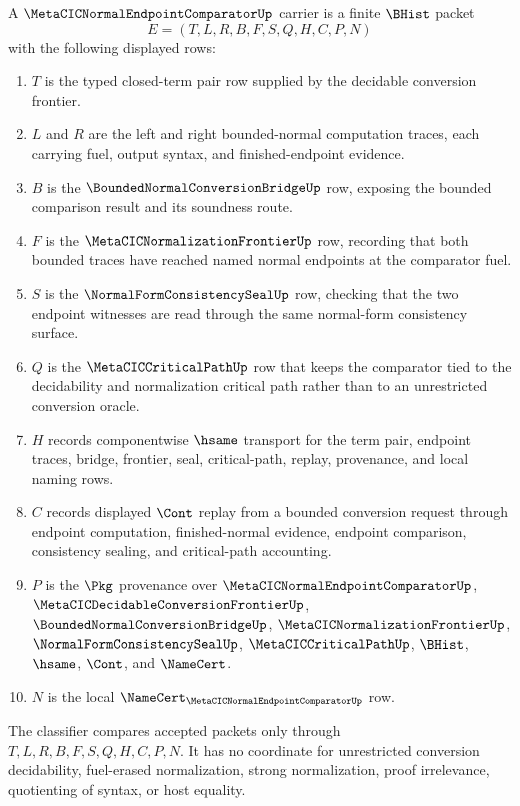 \begin{definition}
\label{def:metacic-normal-endpoint-comparator-carrier}
A $\MetaCICNormalEndpointComparatorUp$ carrier is a finite $\BHist$ packet
$$
E=(T,L,R,B,F,S,Q,H,C,P,N)
$$
with the following displayed rows:
\begin{enumerate}
\item $T$ is the typed closed-term pair row supplied by the decidable conversion frontier.
\item $L$ and $R$ are the left and right bounded-normal computation traces, each carrying fuel, output syntax, and finished-endpoint evidence.
\item $B$ is the $\BoundedNormalConversionBridgeUp$ row, exposing the bounded comparison result and its soundness route.
\item $F$ is the $\MetaCICNormalizationFrontierUp$ row, recording that both bounded traces have reached named normal endpoints at the comparator fuel.
\item $S$ is the $\NormalFormConsistencySealUp$ row, checking that the two endpoint witnesses are read through the same normal-form consistency surface.
\item $Q$ is the $\MetaCICCriticalPathUp$ row that keeps the comparator tied to the decidability and normalization critical path rather than to an unrestricted conversion oracle.
\item $H$ records componentwise $\hsame$ transport for the term pair, endpoint traces, bridge, frontier, seal, critical-path, replay, provenance, and local naming rows.
\item $C$ records displayed $\Cont$ replay from a bounded conversion request through endpoint computation, finished-normal evidence, endpoint comparison, consistency sealing, and critical-path accounting.
\item $P$ is the $\Pkg$ provenance over $\MetaCICNormalEndpointComparatorUp$, $\MetaCICDecidableConversionFrontierUp$, $\BoundedNormalConversionBridgeUp$, $\MetaCICNormalizationFrontierUp$, $\NormalFormConsistencySealUp$, $\MetaCICCriticalPathUp$, $\BHist$, $\hsame$, $\Cont$, and $\NameCert$.
\item $N$ is the local $\NameCert_{\MetaCICNormalEndpointComparatorUp}$ row.
\end{enumerate}
The classifier compares accepted packets only through $T,L,R,B,F,S,Q,H,C,P,N$. It has no coordinate for unrestricted conversion decidability, fuel-erased normalization, strong normalization, proof irrelevance, quotienting of syntax, or host equality.
\end{definition}

